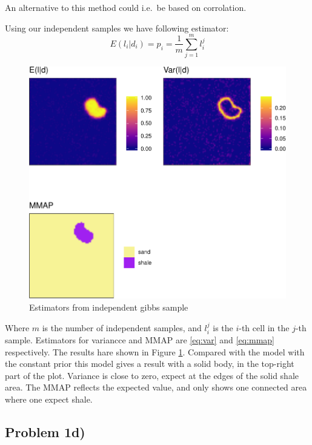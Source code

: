 \documentclass[]{article}
\begin{document}
An alternative to this method could i.e.~be based on corrolation.

Using our independent samples we have following estimator:
\begin{equation}
    E(l_i|d_i) = p_i = \dfrac{1}{m}\sum_{j=1}^ml_i^j
\end{equation}

\begin{figure}
\centering
\includegraphics{Exercise-3_files/figure-latex/fig1c4-1.pdf}
\caption{\label{fig:c4} Estimators from independent gibbs sample}
\end{figure}

Where \(m\) is the number of independent samples, and \(l_i^j\) is the
\(i\)-th cell in the \(j\)-th sample. Estimators for variancce and MMAP
are \eqref{eq:var} and \eqref{eq:mmap} respectively. The results hare
shown in Figure \ref{fig:c4}. Compared with the model with the constant
prior this model gives a result with a solid body, in the top-right part
of the plot. Variance is close to zero, expect at the edges of the solid
shale area. The MMAP reflects the expected value, and only shows one
connected area where one expect shale.

\hypertarget{problem-1d}{%
\subsection{Problem 1d)}\label{problem-1d}}
\end{document}
